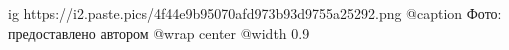  
 
 
 
 

\ifcmt
  ig https://i2.paste.pics/4f44e9b95070afd973b93d9755a25292.png
	@caption Фото: предоставлено автором
  @wrap center
  @width 0.9
\fi
